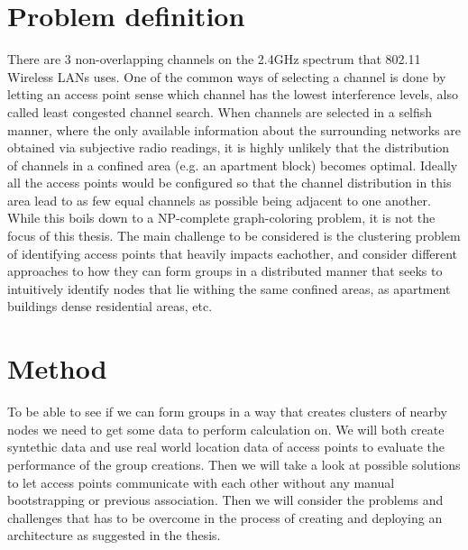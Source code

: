 \section{Problem definition}
There are 3 non-overlapping channels on the 2.4GHz spectrum that 802.11 Wireless LANs uses. One of the common ways of selecting a channel
is done by letting an access point sense which channel has the lowest interference levels, also called least congested channel search.
When channels are selected in a selfish manner, where the only available information about the surrounding networks are obtained via
subjective radio readings, it is highly unlikely that the distribution of channels in a confined area (e.g. an apartment block) becomes optimal.  
Ideally all the access points would be configured so that the channel distribution in this area lead to as few equal channels as possible
being adjacent to one another. While this boils down to a NP-complete graph-coloring problem, it is not the focus of this thesis.
The main challenge to be considered is the clustering problem of identifying access points that heavily impacts eachother, and consider different approaches to how 
they can form groups in a distributed manner that seeks to intuitively identify nodes that lie withing the same confined areas, as apartment buildings
dense residential areas, etc. 

\section{Method}
To be able to see if we can form groups in a way that creates clusters of nearby nodes we need to get some data to perform
calculation on. We will both create syntethic data and use real world location data of access points to evaluate the performance of the group creations. 
Then we will take a look at possible solutions to let access points communicate with each other without any manual bootstrapping or 
previous association. Then we will consider the problems and challenges that has to be overcome in the process of creating and deploying 
an architecture as suggested in the thesis. 





